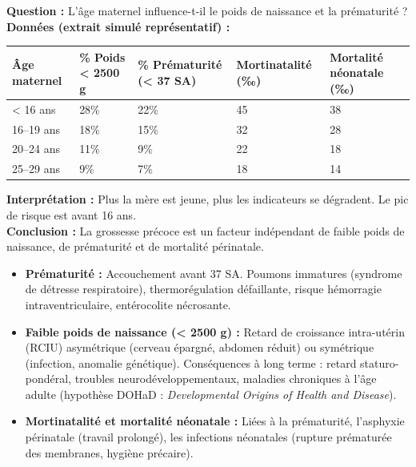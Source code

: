 \documentclass[11pt]{article}
\begin{document}
\begin{experience}
\textbf{Question :} L'âge maternel influence-t-il le poids de naissance et la prématurité ?\\
\textbf{Données (extrait simulé représentatif) :}
\begin{center}
\begin{tabularx}{\linewidth}{|l|X|X|X|X|}\hline
\rowcolor{popblueL}
\textbf{Âge maternel} & \textbf{\% Poids < 2500 g} & \textbf{\% Prématurité (< 37 SA)} & \textbf{Mortinatalité (‰)} & \textbf{Mortalité néonatale (‰)} \\ \hline
< 16 ans & 28\% & 22\% & 45 & 38 \\ \hline
16--19 ans & 18\% & 15\% & 32 & 28 \\ \hline
20--24 ans & 11\% & 9\% & 22 & 18 \\ \hline
25--29 ans & 9\% & 7\% & 18 & 14 \\ \hline
\end{tabularx}
\end{center}
\textbf{Interprétation :} Plus la mère est jeune, plus les indicateurs se dégradent. Le pic de risque est avant 16 ans.\\
\textbf{Conclusion :} La grossesse précoce est un facteur indépendant de faible poids de naissance, de prématurité et de mortalité périnatale.
\end{experience}

\begin{propriete}
\begin{itemize}
    \item \textbf{Prématurité :} Accouchement avant 37 SA. Poumons immatures (syndrome de détresse respiratoire), thermorégulation défaillante, risque hémorragie intraventriculaire, entérocolite nécrosante.
    \item \textbf{Faible poids de naissance (< 2500 g) :} Retard de croissance intra-utérin (RCIU) asymétrique (cerveau épargné, abdomen réduit) ou symétrique (infection, anomalie génétique). Conséquences à long terme : retard staturo-pondéral, troubles neurodéveloppementaux, maladies chroniques à l'âge adulte (hypothèse DOHaD : \emph{Developmental Origins of Health and Disease}).
    \item \textbf{Mortinatalité et mortalité néonatale :} Liées à la prématurité, l'asphyxie périnatale (travail prolongé), les infections néonatales (rupture prématurée des membranes, hygiène précaire).
\end{itemize}
\end{propriete}
\end{document}
